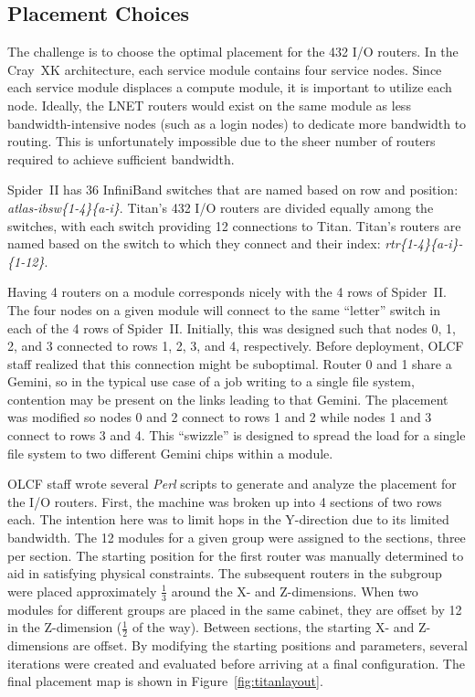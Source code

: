 \subsection{Placement Choices}

The challenge is to choose the optimal placement for the 432 I/O routers. In
the Cray~XK architecture, each service module contains four service nodes.
Since each service module displaces a compute module, it is important to
utilize each node.  Ideally, the LNET routers would exist on the same module as
less bandwidth-intensive nodes (such as a login nodes) to dedicate more
bandwidth to routing.  This is unfortunately impossible due to the sheer number
of routers required to achieve sufficient bandwidth.

Spider~II has 36 InfiniBand switches that are named based on row and position:
\textit{atlas-ibsw\{1-4\}\{a-i\}}.  Titan's 432 I/O routers are divided equally
among the switches, with each switch providing 12 connections to Titan.
Titan's routers are named based on the switch to which they connect and their
index: \textit{rtr\{1-4\}\{a-i\}-\{1-12\}}.

Having 4 routers on a module corresponds nicely with the 4 rows of Spider~II.
The  four nodes on a given module will connect to the same ``letter'' switch in
each of the 4 rows of Spider~II.  Initially, this was designed such that nodes
0, 1, 2, and 3 connected to rows 1, 2, 3, and 4, respectively.  Before
deployment, OLCF staff realized that this connection might be suboptimal.
Router 0 and 1 share a Gemini, so in the typical use case of a job writing to a
single file system, contention may be present on the links leading to that
Gemini.  The placement was modified so nodes 0 and 2 connect to rows 1 and 2
while nodes 1 and 3 connect to rows 3 and 4.  This ``swizzle'' is designed to
spread the load for a single file system to two different Gemini chips within a
module.

OLCF staff wrote several \textit{Perl} scripts to generate and analyze the
placement for the I/O routers.  First, the machine was broken up into 4
sections of two rows each.  The intention here was to limit hops in the
Y-direction due to its limited bandwidth.  The 12 modules for a given group
were assigned to the sections, three per section.  The starting position for
the first router was manually determined to aid in satisfying physical
constraints.  The subsequent routers in the subgroup were placed approximately
$\frac{1}{3}$ around the X- and Z-dimensions.  When two modules for different
groups are placed in the same cabinet, they are offset by 12 in the Z-dimension
($\frac{1}{2}$ of the way).  Between sections, the starting X- and Z-dimensions
are offset.  By modifying the starting positions and parameters, several
iterations were created and evaluated before arriving at a final configuration.
The final placement map is shown in Figure~\ref{fig:titanlayout}.

